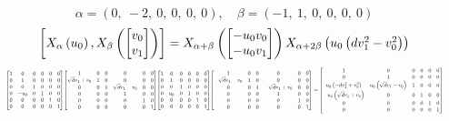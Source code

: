 \documentclass[11pt]{article}
\theoremstyle{definition}
\begin{document}
\[
\alpha = \left( 0, \  -2, \  0, \  0, \  0, \  0\right), \quad \beta = \left( -1, \  1, \  0, \  0, \  0, \  0\right)
\]
\[
\scaletoalign{\textwidth}{\left[ X_{\alpha}\left(u_{0}\right), X_{\beta}\left(\left[\begin{matrix}v_{0}\\v_{1}\end{matrix}\right]\right) \right] = X_{\alpha + \beta}\left(\left[\begin{matrix}- u_{0} v_{0}\\- u_{0} v_{1}\end{matrix}\right]\right) X_{\alpha + 2\beta}\left(u_{0} \left(d v_{1}^{2} - v_{0}^{2}\right)\right)}
\]
\[
\scaletoalign{\textwidth}{{\left[\begin{matrix}1 & 0 & 0 & 0 & 0 & 0\\0 & 1 & 0 & 0 & 0 & 0\\0 & 0 & 1 & 0 & 0 & 0\\0 & - u_{0} & 0 & 1 & 0 & 0\\0 & 0 & 0 & 0 & 1 & 0\\0 & 0 & 0 & 0 & 0 & 1\end{matrix}\right]} {\left[\begin{matrix}1 & 0 & 0 & 0 & 0 & 0\\\sqrt{d} v_{1} + v_{0} & 1 & 0 & 0 & 0 & 0\\0 & 0 & 1 & \sqrt{d} v_{1} - v_{0} & 0 & 0\\0 & 0 & 0 & 1 & 0 & 0\\0 & 0 & 0 & 0 & 1 & 0\\0 & 0 & 0 & 0 & 0 & 1\end{matrix}\right]} {\left[\begin{matrix}1 & 0 & 0 & 0 & 0 & 0\\0 & 1 & 0 & 0 & 0 & 0\\0 & 0 & 1 & 0 & 0 & 0\\0 & u_{0} & 0 & 1 & 0 & 0\\0 & 0 & 0 & 0 & 1 & 0\\0 & 0 & 0 & 0 & 0 & 1\end{matrix}\right]} {\left[\begin{matrix}1 & 0 & 0 & 0 & 0 & 0\\- \sqrt{d} v_{1} - v_{0} & 1 & 0 & 0 & 0 & 0\\0 & 0 & 1 & - \sqrt{d} v_{1} + v_{0} & 0 & 0\\0 & 0 & 0 & 1 & 0 & 0\\0 & 0 & 0 & 0 & 1 & 0\\0 & 0 & 0 & 0 & 0 & 1\end{matrix}\right]} = {\left[\begin{matrix}1 & 0 & 0 & 0 & 0 & 0\\0 & 1 & 0 & 0 & 0 & 0\\u_{0} \left(- d v_{1}^{2} + v_{0}^{2}\right) & u_{0} \left(\sqrt{d} v_{1} - v_{0}\right) & 1 & 0 & 0 & 0\\- u_{0} \left(\sqrt{d} v_{1} + v_{0}\right) & 0 & 0 & 1 & 0 & 0\\0 & 0 & 0 & 0 & 1 & 0\\0 & 0 & 0 & 0 & 0 & 1\end{matrix}\right]}}
\]
\end{document}
